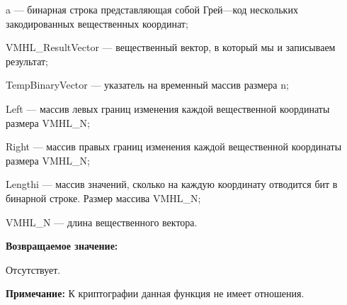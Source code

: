 \documentclass[a4paper,12pt]{article}
\begin{document}
a --- бинарная строка представляющая собой Грей---код нескольких закодированных вещественных координат;
 
VMHL\_ResultVector --- вещественный вектор, в который мы и записываем результат;
 
TempBinaryVector --- указатель на временный массив  размера n;
 
Left --- массив левых границ изменения каждой вещественной координаты размера VMHL\_N;
 
Right --- массив правых границ изменения каждой вещественной координаты размера VMHL\_N;
 
Lengthi --- массив значений, сколько на каждую координату отводится бит в бинарной строке. Размер массива VMHL\_N;
 
VMHL\_N --- длина вещественного вектора.
 
\textbf{Возвращаемое значение:}
 
Отсутствует.

\textbf{Примечание:}
 К криптографии данная функция не имеет отношения.
\end{document}
